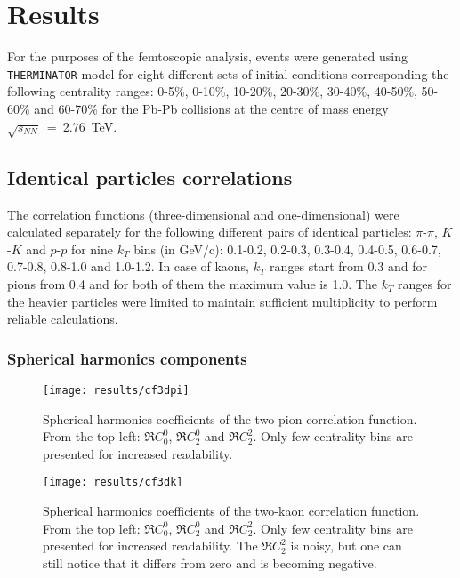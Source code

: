 \chapter{Results}
  For the purposes of the femtoscopic analysis, events were generated using \verb|THERMINATOR| model for eight different sets of initial conditions corresponding the following centrality ranges: 0-5\%, 0-10\%, 10-20\%, 20-30\%, 30-40\%, 40-50\%, 50-60\% and 60-70\% for the Pb-Pb collisions at the centre of mass energy $\sqrt{s_{NN}}~=~2.76$~TeV.
  \section{Identical particles correlations}
    The correlation functions (three-dimensional and one-dimensional) were calculated separately for the following different pairs of identical particles: $\pi$-$\pi$, $K$-$K$ and  $p$-$p$ for nine $k_T$ bins (in GeV/c): 0.1-0.2, 0.2-0.3, 0.3-0.4, 0.4-0.5, 0.6-0.7, 0.7-0.8, 0.8-1.0 and 1.0-1.2.
    In case of kaons, $k_T$ ranges start from 0.3 and for pions from 0.4 and for both of them the maximum value is 1.0.
    The $k_T$ ranges for the heavier particles were limited to maintain sufficient multiplicity to perform reliable calculations.
    \subsection{Spherical harmonics components}

      \begin{figure}[h]
        \centering
        \centerline{\texttt{[image: results/cf3dpi]}}
        \caption{Spherical harmonics coefficients of the two-pion correlation function. From the top left: $\Re C^0_0$, $\Re C^0_2$ and $\Re C^2_2$. Only few centrality bins are presented for increased readability.}
      \label{fig:cf3dpi}
      \end{figure}

      \begin{figure}[h]
        \centering
        \centerline{\texttt{[image: results/cf3dk]}}
        \caption{Spherical harmonics coefficients of the two-kaon correlation function. From the top left: $\Re C^0_0$, $\Re C^0_2$ and $\Re C^2_2$. Only few centrality bins are presented for increased readability. The $\Re C^2_2$ is noisy, but one can still notice that it differs from zero and is becoming negative.}
      \label{fig:cf3dk}
      \end{figure} 

